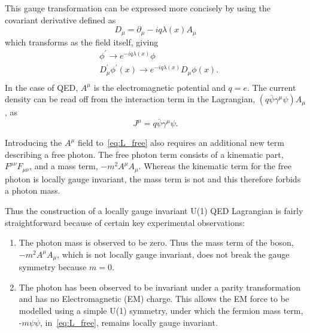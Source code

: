 This gauge transformation can be expressed more concisely by using the covariant derivative defined as
\begin{equation}
 D_{\mu} = \partial_{\mu} - iq\lambda(x)A_{\mu}
\end{equation}
which transforms as the field itself, giving %
\begin{equation}
  \begin{split}
    &\phi^\prime  \to e^{-iq\lambda(x)}\phi\\
    &D_{\mu}^{\prime}\phi^\prime(x) \to e^{-iq\lambda(x)}D_{\mu}\phi(x).\\
  \end{split}
\end{equation}
In the case of QED, $A^{\mu}$ is the electromagnetic potential and $q = e$. The current density can be read off from the interaction term in the Lagrangian, $(q\overline{\psi}\gamma^{\mu}\psi)A_{\mu}$, as
\begin{equation}
  J^{\mu} = q\overline{\psi}\gamma^{\mu}\psi.
\end{equation}

Introducing the $A^{\mu}$ field to~\autoref{eq:L_free} also requires an additional new term describing a free photon. The free photon term consists of a kinematic part, $F^{\mu\nu}F_{\mu\nu}$, and a mass term, $-m^{2}A^{\mu}A_{\mu}$. Whereas the kinematic term for the free photon is locally gauge invariant, the mass term is not and this therefore forbids a photon mass.

Thus the construction of a locally gauge invariant U(1) QED Lagrangian is fairly straightforward because of certain key experimental observations:
\begin{enumerate}
\item
  The photon mass is observed to be zero. Thus the mass term of the boson, $-m^{2}A^{\mu}A_{\mu}$, which is not locally gauge invariant, does not break the gauge symmetry because $m=0$.
\item
  The photon has been observed to be invariant under a parity transformation and has no Electromagnetic (\Gls{EM}) charge. This allows the EM force to be modelled using a  simple U(1) symmetry, under which the fermion mass term, -$m\psi\overline{\psi}$, in~\autoref{eq:L_free}, remains locally gauge invariant.

\end{enumerate}
